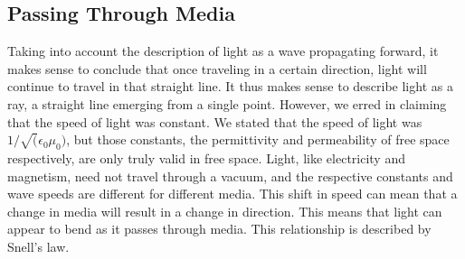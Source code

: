 \documentclass[]{article}
\begin{document}
\subsection{Passing Through Media}
Taking into account the description of light as a wave propagating forward, it makes sense to conclude that once traveling in a certain direction, light will continue to travel in that straight line. It thus makes sense to describe light as a ray, a straight line emerging from a single point. However, we erred in claiming that the speed of light was constant. We stated that the speed of light was \( 1/\sqrt(\epsilon_0 \mu_0) \), but those constants, the permittivity and permeability of free space respectively, are only truly valid in free space. Light, like electricity and magnetism, need not travel through a vacuum, and the respective constants and wave speeds are different for different media. This shift in speed can mean that a change in media will result in a change in direction. This means that light can appear to bend as it passes through media. This relationship is described by Snell's law.
\end{document}
